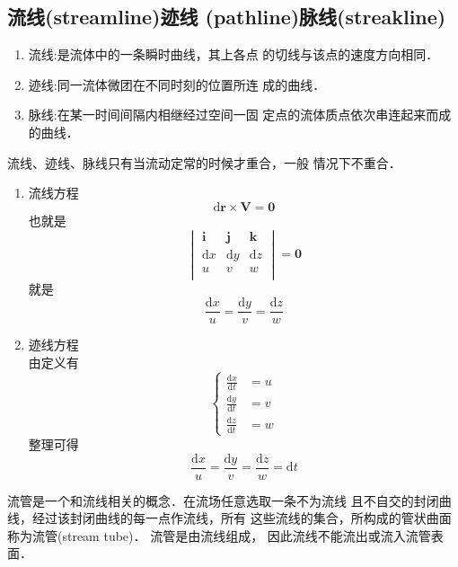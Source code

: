 \subsection{流线(streamline)\quad 迹线
	(pathline)\quad 脉线(streakline)}
\begin{enumerate}
	\item 流线:是流体中的一条瞬时曲线，其上各点
	      的切线与该点的速度方向相同．
	\item 迹线:同一流体微团在不同时刻的位置所连
	      成的曲线．
	\item 脉线:在某一时间间隔内相继经过空间一固
	      定点的流体质点依次串连起来而成的曲线．
\end{enumerate}
\begin{note}
	流线、迹线、脉线只有当流动定常的时候才重合，一般
	情况下不重合．
\end{note}
\begin{enumerate}
	\item 流线方程\\
	      \[
		      \mathrm{d}\mathbf{r}\times \mathbf{V}=\mathbf{0}
	      \]
	      也就是
	      \begin{equation*}
		      \begin{vmatrix}
			      \mathbf{i}  & \mathbf{j}  & \mathbf{k}  \\
			      \mathrm{d}x & \mathrm{d}y & \mathrm{d}z \\
			      u           & v           & w           \\
		      \end{vmatrix}=\mathbf{0}
	      \end{equation*}
	      就是
	      \[
		      \frac{\mathrm{d}x}{u}=\frac{\mathrm{d}y}{v }=
		      \frac{\mathrm{d}z}{w}
	      \]
	\item 迹线方程 \\
	      由定义有
	      \begin{equation*}
		      \begin{cases}
			      \frac{\mathrm{d}x}{\mathrm{d}t } & =u \\
			      \frac{\mathrm{d}y}{\mathrm{d}t } & =v \\
			      \frac{\mathrm{d}z}{\mathrm{d}t } & =w
		      \end{cases}
	      \end{equation*}
	      整理可得
	      \[
		      \frac{\mathrm{d}x}{u}=\frac{\mathrm{d}y}{v }=
		      \frac{\mathrm{d}z}{w}=\mathrm{d} t
	      \]
\end{enumerate}

流管是一个和流线相关的概念．在流场任意选取一条不为流线
且不自交的封闭曲线，经过该封闭曲线的每一点作流线，所有
这些流线的集合，所构成的管状曲面称为流管(stream tube)．
流管是由流线组成，
因此流线不能流出或流入流管表面．

